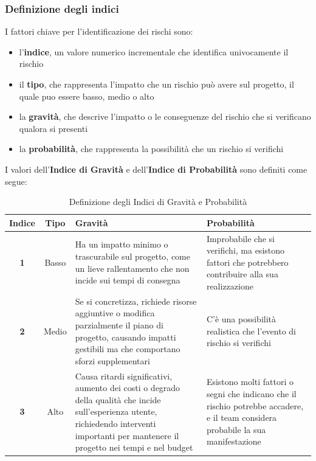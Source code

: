 \documentclass{article}
\begin{document}
        \subsubsection{Definizione degli indici}
        I fattori chiave per l’identificazione dei rischi sono:
        \begin{itemize}
            \item l’\textbf{indice}, un valore numerico incrementale che identifica univocamente il rischio
            \item il \textbf{tipo}, che rappresenta l’impatto che un rischio può avere sul progetto, il quale puo essere basso, medio o alto
            \item la \textbf{gravità}, che descrive l'impatto o le conseguenze del rischio che si verificano qualora si presenti
            \item la \textbf{probabilità}, che rappresenta la possibilità che un rischio si verifichi
        \end{itemize}
        I valori dell'\textbf{Indice di Gravità} e dell'\textbf{Indice di Probabilità} sono definiti come segue:
        \begin{table}[h!]
            \centering
            \begin{tabular}{|c|c|p{6cm}|p{6cm}|}
                \hline
                \textbf{Indice} & \textbf{Tipo} & \textbf{Gravità} & \textbf{Probabilità} \\
                \hline
                \textbf{1} & Basso & Ha un impatto minimo o trascurabile sul progetto, come un lieve rallentamento che non incide sui tempi di consegna & Improbabile che si verifichi, ma esistono fattori che potrebbero contribuire alla sua realizzazione \\
                \hline
                \textbf{2} & Medio & Se si concretizza, richiede risorse aggiuntive o modifica parzialmente il piano di progetto, causando impatti gestibili ma che comportano sforzi supplementari & C'è una possibilità realistica che l'evento di rischio si verifichi \\
                \hline
                \textbf{3} & Alto & Causa ritardi significativi, aumento dei costi o degrado della qualità che incide sull'esperienza utente, richiedendo interventi importanti per mantenere il progetto nei tempi e nel budget & Esistono molti fattori o segni che indicano che il rischio potrebbe accadere, e il team considera probabile la sua manifestazione \\
                \hline
            \end{tabular}
            \caption{Definizione degli Indici di Gravità e Probabilità}
            \label{tab:definizione_indici}
        \end{table}
        
\end{document}
